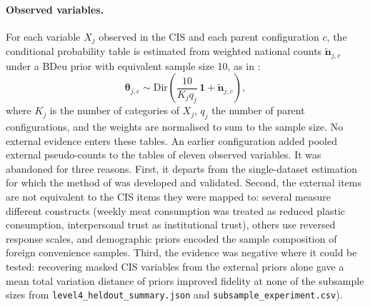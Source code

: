 \paragraph{Observed variables.}
For each variable $X_j$ observed in the CIS and each parent configuration $c$,
the conditional probability table is estimated from weighted national counts
$\tilde{\mathbf{n}}_{j,c}$ under a BDeu prior with equivalent sample size 10,
as in \citet{martins2024}:
\begin{equation}
\boldsymbol{\theta}_{j,c} \sim \mathrm{Dir}\!\left(\frac{10}{K_j q_j}\,\mathbf{1} + \tilde{\mathbf{n}}_{j,c}\right),
\label{eq:cpt}
\end{equation}
where $K_j$ is the number of categories of $X_j$, $q_j$ the number of parent
configurations, and the weights are normalised to sum to the sample size.
No external evidence enters these tables. An earlier configuration added
pooled external pseudo-counts to the tables of eleven observed variables. It
was abandoned for three reasons. First, it departs from the single-dataset
estimation for which the method of \citet{martins2024} was developed and
validated. Second, the external items are not equivalent to the CIS items they
were mapped to: several measure different constructs (weekly meat consumption
was treated as reduced plastic consumption, interpersonal trust as institutional
trust), others use reversed response scales, and demographic priors encoded the
sample composition of foreign convenience samples. Third, the evidence was
negative where it could be tested: recovering masked CIS variables from the
external priors alone gave a mean total variation distance of %
priors improved fidelity at none of the subsample sizes from %
\texttt{level4\_heldout\_summary.json} and \texttt{subsample\_experiment.csv}).

